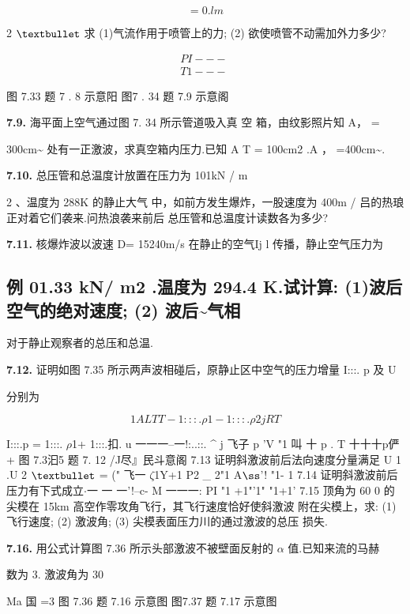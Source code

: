\[=0.lm\]

2 ${\rm •}$ 求 (1)气流作用于喷管上的力; (2) 欲使喷管不动需加外力多少?

\begin{gather*}
PI---\\
T1 --- ~
\end{gather*}

图 7.33 题 7 . 8 示意阳 图7 . 34 题 7.9 示意阁

\noindent\textbf{7.9.} 海平面上空气通过图 7. 34 所示管道吸入真 空 箱，由纹影照片知 A， =

300cm\textasciitilde{} 处有一正激波，求真空箱内压力.已知 A T = 100cm2 .A ， =400cm\textasciitilde{}.

\noindent\textbf{7.10.} 总压管和总温度计放置在压力为 101kN / m

2 、温度为 288K 的静止大气 中，如前方发生爆炸，一股速度为 400m / 吕的热琅正对着它们袭来.问热浪袭来前后 总压管和总温度计读数各为多少?

\noindent\textbf{7.11.} 核爆炸波以波速 D= 15240m/s 在静止的空气Ij l 传播，静止空气压力为

\subsection*{例 01.33  kN/ m2 .温度为 294.4 K.试计算: (1)波后空气的绝对速度; (2) 波后\textasciitilde{}气相}

对于静止观察者的总压和总温.

\noindent\textbf{7.12.} 证明如图 7.35 所示两声波相碰后，原静止区中空气的压力增量 I:::. p 及 U

分别为

\[1 A L TT - 1:::. \rho 1- 1:::. \rho  2 jRT\]

I:::.p = 1:::. $\rho$1+ 1:::.扣. u 一一一--一!:..::. \textasciicircum{} j 飞子 p 'V "1 叫 十 p . T 十十十p俨+ 图 7.3汩5 题 7. 12 /J尽』民斗意阁 7.13 证明斜激波前后法向速度分量满足 U 1 .U 2 ${\rm •}$ = (" 飞一 $\zeta$1Y+1 P2 \_ 2"1 A${\rm ß}$'! "1- 1 7.14 证明斜激波前后压力有下式成立$\cdot $一 一 一'!--c- M 一一一: PI "1 +1"'1" "1+1' 7.15 顶角为 60 0 的尖模在 15km 高空作零攻角飞行，其飞行速度恰好使斜激波 附在尖模上，求: (1)飞行速度; (2) 激波角; (3) 尖模表面压力川的通过激波的总压 损失.

\noindent\textbf{7.16.} 用公式计算图 7.36 所示头部激波不被壁面反射的 $\alpha$ 值.已知来流的马赫

数为 3. 激波角为 30

Ma 国 =3 图 7.36 题 7.16 示意图 图7.37 题 7.17 示意图

